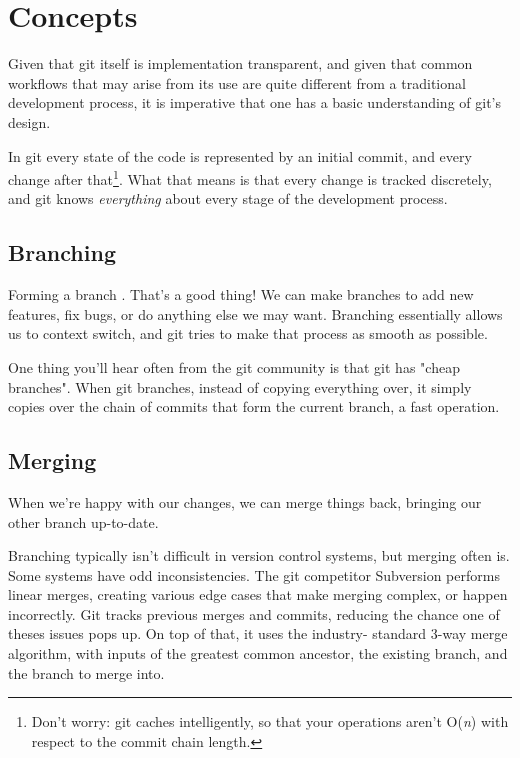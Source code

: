 \documentclass[11pt,letterpaper,twoside]{report}
\begin{document}
\chapter{Concepts}

Given that git itself is implementation transparent, and given that common
workflows that may arise from its use are quite different from a traditional
development process\cite{dvcs-government}, it is imperative that one has a basic
understanding of git's design.

In git every state of the code is represented by an initial commit, and every
change after that\footnote{Don't worry: git caches intelligently, so that your
operations aren't O(\textit{n}) with respect to the commit chain length.}. What
that means is that every change is tracked discretely, and git knows
\emph{everything} about every stage of the development process.

\section{Branching}

Forming a branch . That's a good
thing! We can make branches to add new features, fix bugs, or do anything else
we may want. Branching essentially allows us to context switch, and git tries to
make that process as smooth as possible. \cite{git-branch-example}

One thing you'll hear often from the git community is that git has "cheap
branches". When git branches, instead of copying everything over, it simply
copies over the chain of commits that form the current branch, a fast operation.

\section{Merging}

When we're happy with our changes, we can merge things back, bringing our other
branch up-to-date.

Branching typically isn't difficult in version control systems, but merging
often is. Some systems have odd inconsistencies. The git competitor Subversion
performs linear merges, creating various edge cases that make merging complex,
or happen incorrectly. Git tracks previous merges and commits, reducing the
chance one of theses issues pops up. On top of that, it uses the industry-
standard 3-way merge algorithm, with inputs of the greatest common ancestor, the
existing branch, and the branch to merge into. \cite{git-manpages}
\end{document}
